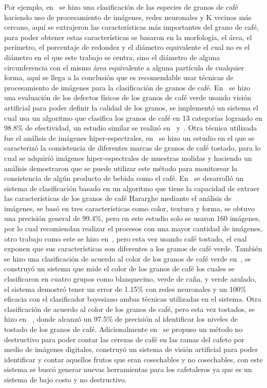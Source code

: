 Por ejemplo, en~\citep{Arboleda2018} se hizo una clasificación de las especies de granos de café haciendo uso de procesamiento de imágenes, redes neuronales y K vecinos más cercano, aquí se extrajeron las características más importantes del grano de café, para poder obtener estas características se basaron en la morfología, el área, el perímetro, el porcentaje de redondez y el diámetro equivalente el cual no es el diámetro en el que este trabajo se centra, sino el diámetro de alguna circunferencia con el mismo área equivalente a alguna partícula de cualquier forma, aquí se llega a la conclusión que es recomendable usar técnicas de procesamiento de imágenes para la clasificación de granos de café. En~\citep{Portugal2016} se hizo una evaluación de los defectos físicos de los granos de café verde usando visión artificial para poder definir la calidad de los granos, se implementó un sistema el cual usa un algoritmo que clasifica los granos de café en 13 categorías logrando en 98.8\% de efectividad, un estudio similar se realizó en~\citep{Carrillo2009} y~\citep{RamirezTicona2016}. Otra técnica utilizada fue el análisis de imágenes hiper-espectrales, en~\citep{Nansen2016} se hizo un estudio en el que se caracterizó la consistencia de diferentes marcas de granos de café tostado, para lo cual se adquirió imágenes hiper-espectrales de muestras molidas y haciendo un análisis demostraron que se puede utilizar este método para monitorear la consistencia de algún producto de bebida como el café. En~\citep{Girma2013} se desarrolló un sistema de clasificación basado en un algoritmo que tiene la capacidad de extraer las características de los granos de café Hararghe mediante el análisis de imágenes, se basó en tres características como color, textura y forma, se obtuvo una precisión general de 99.4\%, pero en este estudio solo se usaron 160 imágenes, por lo cual recomiendan realizar el procesos con una mayor cantidad de imágenes, otro trabajo como este se hizo en~\citep{Birhanu2015}, pero esta vez usando café tostado, el cual exponen que sus características son diferentes a los granos de café verde. También se hizo una clasificación de acuerdo al color de los granos de café verde en~\citep{Oliveira2016}, se construyó un sistema que mide el color de los granos de café los cuales se clasificaron en cuatro grupos como blanquecino, verde de caña, y verde azulado, el sistema demostró tener un error de 1.15\% con redes neuronales y un 100\% eficacia con el clasificador bayesiano ambas técnicas utilizadas en el sistema. Otra clasificación de acuerdo al color de los granos de café, pero esta vez tostados, se hizo en ~\citep{Nasution2017}, donde alcanzó un 97.5\% de precisión al identificar los niveles de tostado de los granos de café. Adicionalmente en~\citep{Ramos2017} se propuso un método no destructivo para poder contar las cerezas de café en las ramas del cafeto por medio de imágenes digitales, construyó un sistema de visión artificial para poder identificar y contar aquellos frutos que eran cosechables y no cosechables, con este sistema se buscó generar nuevas herramientas para los cafetaleros ya que es un sistema de bajo costo y no destructivo.

